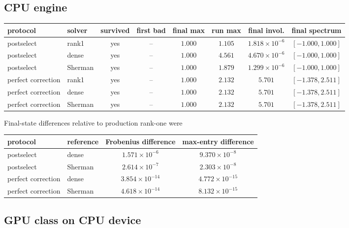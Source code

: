 \documentclass[aps,prb,onecolumn,nofootinbib,superscriptaddress]{revtex4-2}
\begin{document}
\subsection{CPU engine}

\begin{center}
\begin{tabular}{llcccccc}
\toprule
protocol & solver & survived & first bad & final max & run max & final invol. & final spectrum\\
\midrule
postselect & rank1 & yes & -- & \(1.000\) & \(1.105\) & \(1.818\times10^{-6}\) & \([-1.000,1.000]\)\\
postselect & dense & yes & -- & \(1.000\) & \(4.561\) & \(4.670\times10^{-6}\) & \([-1.000,1.000]\)\\
postselect & Sherman & yes & -- & \(1.000\) & \(1.879\) & \(1.299\times10^{-6}\) & \([-1.000,1.000]\)\\
perfect correction & rank1 & yes & -- & \(1.000\) & \(2.132\) & \(5.701\) & \([-1.378,2.511]\)\\
perfect correction & dense & yes & -- & \(1.000\) & \(2.132\) & \(5.701\) & \([-1.378,2.511]\)\\
perfect correction & Sherman & yes & -- & \(1.000\) & \(2.132\) & \(5.701\) & \([-1.378,2.511]\)\\
\bottomrule
\end{tabular}
\end{center}

Final-state differences relative to production rank-one were
\begin{center}
\begin{tabular}{llcc}
\toprule
protocol & reference & Frobenius difference & max-entry difference\\
\midrule
postselect & dense & \(1.571\times10^{-6}\) & \(9.370\times10^{-8}\)\\
postselect & Sherman & \(2.614\times10^{-7}\) & \(2.303\times10^{-8}\)\\
perfect correction & dense & \(3.854\times10^{-14}\) & \(4.772\times10^{-15}\)\\
perfect correction & Sherman & \(4.618\times10^{-14}\) & \(8.132\times10^{-15}\)\\
\bottomrule
\end{tabular}
\end{center}

\subsection{GPU class on CPU device}
\end{document}
